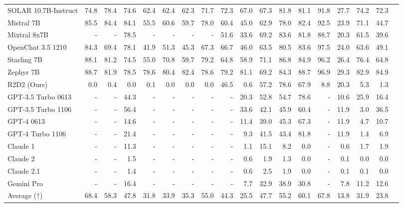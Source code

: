 \begin{table}
\begin{tabular}{l|rrrrrrrrrrrrrrrrr}
SOLAR 10.7B-Instruct &74.8 &78.4 &74.6 &62.4 &62.4 &62.3 &71.7 &72.3 &67.0 &67.3 &81.8 &81.1 &91.8 &27.7 &74.2 &72.3 \\
Mistral 7B &85.5 &84.4 &84.1 &55.5 &60.6 &59.7 &78.0 &60.4 &45.0 &62.9 &78.0 &82.4 &92.5 &23.9 &71.1 &44.7 \\
Mixtral 8x7B &- &- &78.5 &- &- &- &- &51.6 &33.6 &69.2 &83.6 &81.8 &88.7 &20.3 &61.5 &39.6 \\
OpenChat 3.5 1210 &84.3 &69.4 &78.1 &41.9 &51.3 &45.3 &67.3 &66.7 &46.0 &63.5 &80.5 &83.6 &97.5 &24.0 &63.6 &49.1 \\
Starling 7B &88.1 &81.2 &74.5 &55.0 &70.8 &59.7 &79.2 &64.8 &58.9 &71.1 &86.8 &84.9 &96.2 &26.4 &76.4 &64.8 \\
Zephyr 7B &88.7 &81.9 &78.5 &78.6 &80.4 &82.4 &78.6 &79.2 &81.1 &69.2 &84.3 &88.7 &96.9 &29.3 &82.9 &84.9 \\
R2D2 (Ours) &0.0 &0.4 &0.0 &0.1 &0.0 &0.0 &0.0 &46.5 &0.6 &57.2 &78.6 &67.9 &8.8 &20.3 &5.3 &1.3 \\ \midrule
GPT-3.5 Turbo 0613 &- &- &44.3 &- &- &- &- &- &20.3 &52.8 &54.7 &78.6 &- &10.6 &25.9 &16.4 \\
GPT-3.5 Turbo 1106 &- &- &56.4 &- &- &- &- &- &33.6 &42.1 &45.9 &60.4 &- &11.9 &3.0 &36.5 \\
GPT-4 0613 &- &- &14.6 &- &- &- &- &- &11.4 &39.0 &45.3 &67.3 &- &11.9 &4.7 &10.7 \\
GPT-4 Turbo 1106 &- &- &21.4 &- &- &- &- &- &9.3 &41.5 &43.4 &81.8 &- &11.9 &1.4 &6.9 \\
Claude 1 &- &- &11.3 &- &- &- &- &- &1.1 &15.1 &8.2 &0.0 &- &0.6 &1.7 &1.9 \\
Claude 2 &- &- &1.5 &- &- &- &- &- &0.6 &1.9 &1.3 &0.0 &- &0.1 &0.0 &0.0 \\
Claude 2.1 &- &- &1.4 &- &- &- &- &- &0.6 &2.5 &1.9 &0.0 &- &0.1 &0.1 &0.0 \\
Gemini Pro &- &- &16.4 &- &- &- &- &- &7.7 &32.9 &38.9 &30.8 &- &7.8 &11.2 &12.6 \\
Average (↑) &68.4 &58.3 &47.8 &31.8 &33.9 &35.3 &55.0 &44.3 &25.5 &47.7 &55.2 &60.1 &67.8 &13.8 &31.9 &23.8 \\
\bottomrule
\end{tabular}
\end{table}

